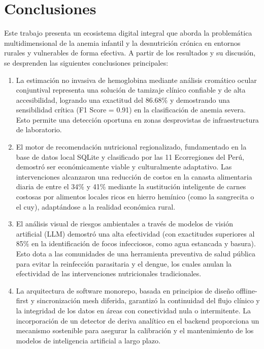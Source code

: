 \section{Conclusiones}
\label{sec:conclusiones}

Este trabajo presenta un ecosistema digital integral que aborda la problemática multidimensional de la anemia infantil y la desnutrición crónica en entornos rurales y vulnerables de forma efectiva. A partir de los resultados y su discusión, se desprenden las siguientes conclusiones principales:

\begin{enumerate}
    \item La estimación no invasiva de hemoglobina mediante análisis cromático ocular conjuntival representa una solución de tamizaje clínico confiable y de alta accesibilidad, logrando una exactitud del 86.68\% y demostrando una sensibilidad crítica (F1 Score = 0.91) en la clasificación de anemia severa. Esto permite una detección oportuna en zonas desprovistas de infraestructura de laboratorio.
    \item El motor de recomendación nutricional regionalizado, fundamentado en la base de datos local SQLite y clasificado por las 11 Ecorregiones del Perú, demostró ser económicamente viable y culturalmente adaptativo. Las intervenciones alcanzaron una reducción de costos en la canasta alimentaria diaria de entre el 34\% y 41\% mediante la sustitución inteligente de carnes costosas por alimentos locales ricos en hierro hemínico (como la sangrecita o el cuy), adaptándose a la realidad económica rural.
    \item El análisis visual de riesgos ambientales a través de modelos de visión artificial (LLM) demostró una alta efectividad (con exactitudes superiores al 85\% en la identificación de focos infecciosos, como agua estancada y basura). Esto dota a las comunidades de una herramienta preventiva de salud pública para evitar la reinfección parasitaria y el dengue, los cuales anulan la efectividad de las intervenciones nutricionales tradicionales.
    \item La arquitectura de software monorepo, basada en principios de diseño offline-first y sincronización mesh diferida, garantizó la continuidad del flujo clínico y la integridad de los datos en áreas con conectividad nula o intermitente. La incorporación de un detector de deriva analítico en el backend proporciona un mecanismo sostenible para asegurar la calibración y el mantenimiento de los modelos de inteligencia artificial a largo plazo.
\end{enumerate}

